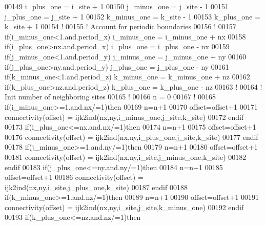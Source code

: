 \begin{DoxyCode}
00149          i\_plus\_one  = i\_site + 1
00150          j\_minus\_one = j\_site - 1
00151          j\_plus\_one  = j\_site + 1
00152          k\_minus\_one = k\_site - 1
00153          k\_plus\_one  = k\_site + 1
00154          \textcolor{comment}{!}
00155          \textcolor{comment}{! Account for periodic boundaries}
00156          \textcolor{comment}{!}
00157          \textcolor{keyword}{if}(i\_minus\_one<1.and.period\_x) i\_minus\_one = i\_minus\_one + nx
00158          \textcolor{keyword}{if}(i\_plus\_one>nx.and.period\_x) i\_plus\_one  = i\_plus\_one  - nx
00159          \textcolor{keyword}{if}(j\_minus\_one<1.and.period\_y) j\_minus\_one = j\_minus\_one + ny
00160          \textcolor{keyword}{if}(j\_plus\_one>ny.and.period\_y) j\_plus\_one  = j\_plus\_one  - ny
00161          \textcolor{keyword}{if}(k\_minus\_one<1.and.period\_z) k\_minus\_one = k\_minus\_one + nz
00162          \textcolor{keyword}{if}(k\_plus\_one>nz.and.period\_z) k\_plus\_one  = k\_plus\_one  - nz
00163          \textcolor{comment}{!}
00164          \textcolor{comment}{! Init number of neighboring sites}
00165          \textcolor{comment}{!}
00166          n = 0
00167          \textcolor{comment}{!}
00168          \textcolor{keyword}{if}(i\_minus\_one>=1.and.nx/=1)\textcolor{keyword}{then}
00169             n=n+1
00170             offset=offset+1
00171             connectivity(offset) = ijk2ind(nx,ny,i\_minus\_one,j\_site,k\_site)
00172          \textcolor{keyword}{endif}
00173          \textcolor{keyword}{if}(i\_plus\_one<=nx.and.nx/=1)\textcolor{keyword}{then}
00174             n=n+1
00175             offset=offset+1
00176             connectivity(offset) = ijk2ind(nx,ny,i\_plus\_one,j\_site,k\_site)
00177          \textcolor{keyword}{endif}
00178          \textcolor{keyword}{if}(j\_minus\_one>=1.and.ny/=1)\textcolor{keyword}{then}
00179             n=n+1
00180             offset=offset+1
00181             connectivity(offset) = ijk2ind(nx,ny,i\_site,j\_minus\_one,k\_site)
00182          \textcolor{keyword}{endif}
00183          \textcolor{keyword}{if}(j\_plus\_one<=ny.and.ny/=1)\textcolor{keyword}{then}
00184             n=n+1
00185             offset=offset+1
00186             connectivity(offset) = ijk2ind(nx,ny,i\_site,j\_plus\_one,k\_site)
00187          \textcolor{keyword}{endif}
00188          \textcolor{keyword}{if}(k\_minus\_one>=1.and.nz/=1)\textcolor{keyword}{then}
00189             n=n+1
00190             offset=offset+1
00191             connectivity(offset) = ijk2ind(nx,ny,i\_site,j\_site,k\_minus\_one)
00192          \textcolor{keyword}{endif}
00193          \textcolor{keyword}{if}(k\_plus\_one<=nz.and.nz/=1)\textcolor{keyword}{then}

\end{DoxyCode}
